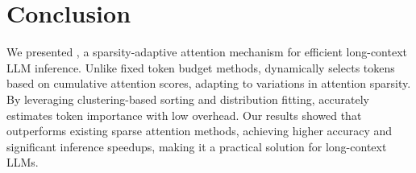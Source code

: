 \section{Conclusion}

We presented \sys, a sparsity-adaptive attention mechanism for efficient long-context LLM inference. Unlike fixed token budget methods, \sys dynamically selects tokens based on cumulative attention scores, adapting to variations in attention sparsity. By leveraging clustering-based sorting and distribution fitting, \sys accurately estimates token importance with low overhead. Our results showed that \sys outperforms existing sparse attention methods, achieving higher accuracy and significant inference speedups, making it a practical solution for long-context LLMs.
